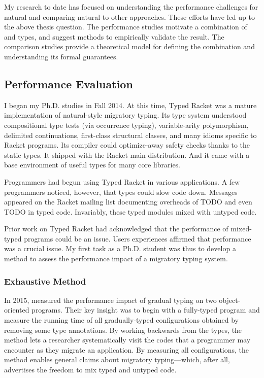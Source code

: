 
My research to date has focused on
 understanding the performance challenges for natural
 and comparing natural to other approaches.
These efforts have led up to the above thesis question.
The performance studies motivate a combination of \tdeep{} and \tshallow{}
 types, and suggest methods to empirically validate the result.
The comparison studies provide a theoretical model for defining the
 combination and understanding its formal guarantees.


\subsection{Performance Evaluation}

I began my Ph.D. studies in Fall 2014.
At this time, Typed Racket was a mature implementation of natural-style
 migratory typing.
Its type system understood compositional type tests (via occurrence typing),
 variable-arity polymorphism,
 delimited continuations,
 first-class structural classes,
 and many idioms specific to Racket programs.
Its compiler could optimize-away safety checks thanks to the static types.
It shipped with the Racket main distribution.
And it came with a base environment of useful types for many core
 libraries.

Programmers had begun using Typed Racket in various applications.
A few programmers noticed, however, that types could slow code down.
Messages appeared on the Racket mailing list documenting overheads
 of TODO and even TODO in typed code.
Invariably, these typed modules mixed with untyped code.

Prior work on Typed Racket had acknowledged that the performance of mixed-typed
 programs could be an issue.
Users experiences affirmed that performance was a crucial issue.
My first task as a Ph.D. student was thus to develop a method to assess the
 performance impact of a migratory typing system.


\subsubsection{Exhaustive Method}

In 2015, \citet{tfdfftf-ecoop-2015} measured the performance impact of gradual typing on
 two object-oriented programs.
Their key insight was to begin with a fully-typed program and measure the
 running time of all gradually-typed configurations obtained by removing
 some type annotations.
By working backwards from the types, the method lets a researcher systematically
 visit the codes that a programmer may encounter as they migrate an
 application.
By measuring all configurations, the method enables general claims about
 migratory typing---which, after all, advertises the freedom to mix typed
 and untyped code.

